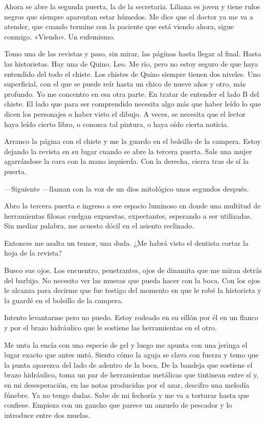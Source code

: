 \documentclass[11pt,twoside,openright]{book}
\begin{document}
 Ahora se abre la segunda puerta, la de la secretaria. Liliana es joven y tiene
 rulos negros que siempre aparentan estar húmedos. Me dice que el doctor ya me
 va a atender, que cuando termine con la paciente que está viendo ahora, sigue
 conmigo. «Viendo». Un eufemismo.
 
 Tomo una de las revistas y paso, sin mirar, las páginas hasta llegar al final.
 Hasta las historietas. Hay una de Quino. Leo. Me río, pero no estoy seguro de
 que haya entendido del todo el chiste. Los chistes de Quino siempre tienen dos
 niveles. Uno superficial, con el que se puede reír hasta un chico de nueve años
 y otro, más profundo. Yo me concentro en esa otra parte. En tratar de entender
 el lado B del chiste. El lado que para ser comprendido necesita algo más que
 haber leído lo que dicen los personajes o haber visto el dibujo. A veces, se
 necesita que el lector haya leído cierto libro, o conozca tal pintura, o haya
 oído cierta noticia.
 
 Arranco la página con el chiste y me la guardo en el bolsillo de la campera.
 Estoy dejando la revista en su lugar cuando se abre la tercera puerta. Sale una
 mujer agarrándose la cara con la mano izquierda. Con la derecha, cierra tras de
 sí la puerta.
 
 ---Siguiente ---llaman con la voz de un dios mitológico unos segundos después.
 
 Abro la tercera puerta e ingreso a ese espacio luminoso en donde una multitud
 de herramientas filosas cuelgan expuestas, expectantes, esperando a ser
 utilizadas. Sin mediar palabra, me acuesto dócil en el asiento reclinado.
 
 Entonces me asalta un temor, una duda. ¿Me habrá visto el dentista cortar la
 hoja de la revista?
 
 Busco sus ojos. Los encuentro, penetrantes, ojos de dinamita que me miran
 detrás del barbijo. No necesito ver las muecas que pueda hacer con la boca. Con
 los ojos le alcanza para decirme que fue testigo del momento en que le robé la
 historieta y la guardé en el bolsillo de la campera.
 
 Intento levantarme pero no puedo. Estoy rodeado en su sillón por él en un
 flanco y por el brazo hidráulico que le sostiene las herramientas en el otro.
 
 Me unta la encía con una especie de gel y luego me apunta con una jeringa el
 lugar exacto que antes untó. Siento cómo la aguja se clava con fuerza y temo
 que la punta aparezca del lado de adentro de la boca. De la bandeja que
 sostiene el brazo hidráulico, toma un par de herramientas metálicas que
 tintinean entre sí y, en mi desesperación, en las notas producidas por el azar,
 descifro una melodía fúnebre.  Ya no tengo dudas. Sabe de mi fechoría y me va a
 torturar hasta que confiese.  Empieza con un gancho que parece un anzuelo de
 pescador y lo introduce entre dos muelas.
 
\end{document}
